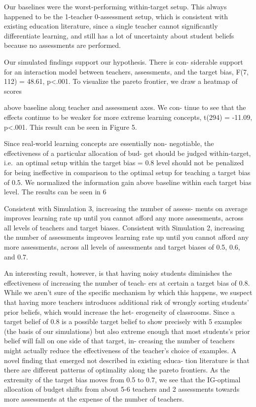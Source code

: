 \documentclass[10pt, letterpaper]{article}
\begin{document}
Our baselines were the worst-performing within-target setup. This always
happened to be the 1-teacher 0-assessment setup, which is consistent
with existing education literature, since a single teacher cannot
significantly differentiate learning, and still has a lot of uncertainty
about student beliefs because no assessments are performed.

Our simulated findings support our hypothesis. There is con- siderable
support for an interaction model between teachers, assessments, and the
target bias, F(7, 112) = 48.61, p\textless{}.001. To visualize the
pareto frontier, we draw a heatmap of scores

above baseline along teacher and assessment axes. We con- tinue to see
that the effects continue to be weaker for more extreme learning
concepts, t(294) = -11.09, p\textless{}.001. This result can be seen in
Figure 5.

Since real-world learning concepts are essentially non- negotiable, the
effectiveness of a particular allocation of bud- get should be judged
within-target, i.e.~an optimal setup within the target bias = 0.8 level
should not be penalized for being ineffective in comparison to the
optimal setup for teaching a target bias of 0.5. We normalized the
information gain above baseline within each target bias level. The
results can be seen in 6

Consistent with Simulation 3, increasing the number of assess- ments on
average improves learning rate up until you cannot afford any more
assessments, across all levels of teachers and target biases. Consistent
with Simulation 2, increasing the number of assessments improves
learning rate up until you cannot afford any more assessments, across
all levels of assessments and target biases of 0.5, 0.6, and 0.7.

An interesting result, however, is that having noisy students diminishes
the effectiveness of increasing the number of teach- ers at certain a
target bias of 0.8. While we aren't sure of the specific mechanism by
which this happens, we suspect that having more teachers introduces
additional risk of wrongly sorting students' prior beliefs, which would
increase the het- erogeneity of classrooms. Since a target belief of 0.8
is a possible target belief to show precisely with 5 examples (the basis
of our simulations) but also extreme enough that most students's prior
belief will fall on one side of that target, in- creasing the number of
teachers might actually reduce the effectiveness of the teacher's choice
of examples. A novel finding that emerged not described in existing
educa- tion literature is that there are different patterns of
optimality along the pareto frontiers. As the extremity of the target
bias moves from 0.5 to 0.7, we see that the IG-optimal allocation of
budget shifts from about 5-6 teachers and 2 assessments towards more
assessments at the expense of the number of teachers.
\end{document}

